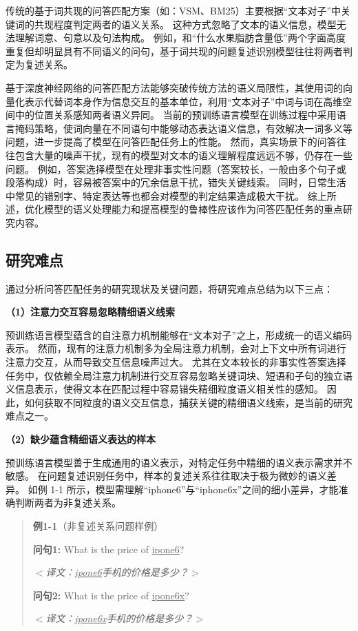 传统的基于词共现的问答匹配方案（如：VSM、BM25）主要根据“文本对子”中关键词的共现程度判定两者的语义关系。
这种方式忽略了文本的语义信息，模型无法理解词意、句意以及句法构成。
例如，{}和{\kai“什么水果脂肪含量低”}两个字面高度重复但却明显具有不同语义的问句，基于词共现的问题复述识别模型往往将两者判定为复述关系。

基于深度神经网络的问答匹配方法能够突破传统方法的语义局限性，其使用词的向量化表示代替词本身作为信息交互的基本单位，利用“文本对子”中词与词在高维空间中的位置关系感知两者语义异同。
当前的预训练语言模型在训练过程中采用语言掩码策略，使词向量在不同语句中能够动态表达语义信息，有效解决一词多义等问题，进一步提高了模型在问答匹配任务上的性能。
然而，真实场景下的问答往往包含大量的噪声干扰，现有的模型对文本的语义理解程度远远不够，仍存在一些问题。
例如，答案选择模型在处理非事实性问题（答案较长，一般由多个句子或段落构成）时，容易被答案中的冗余信息干扰，错失关键线索。
同时，日常生活中常见的错别字、特定表达等也都会对模型的判定结果造成极大干扰。
综上所述，优化模型的语义处理能力和提高模型的鲁棒性应该作为问答匹配任务的重点研究内容。


\subsection{研究难点}

通过分析问答匹配任务的研究现状及关键问题，将研究难点总结为以下三点：

\textbf{\songti （1）注意力交互容易忽略精细语义线索}

预训练语言模型蕴含的自注意力机制能够在“文本对子”之上，形成统一的语义编码表示。
然而，现有的注意力机制多为全局注意力机制，会对上下文中所有词进行注意力交互，从而导致交互信息噪声过大。
尤其在文本较长的非事实性答案选择任务中，仅依赖全局注意力机制进行交互容易忽略关键词块、短语和子句的独立语义信息表示，使得文本在匹配过程中容易错失精细粒度语义相关性的感知。
因此，如何获取不同粒度的语义交互信息，捕获关键的精细语义线索，是当前的研究难点之一。

\textbf{\songti （2）缺少蕴含精细语义表达的样本}

预训练语言模型善于生成通用的语义表示，对特定任务中精细的语义表示需求并不敏感。
在问题复述识别任务中，样本的复述关系往往取决于极为微妙的语义差异。
如例 1-1 所示，模型需理解{\kai“iphone6”}与{\kai“iphone6x”}之间的细小差异，才能准确判断两者为非复述关系。
\begin{quotation}
    \noindent \textbf{\songti 例1-1}（非复述关系问题样例）
    
    \noindent \textbf{问句1:} What is the price of \underline{ipone6}?
    
    \noindent $<$\textit{译文：\underline{ipone6}手机的价格是多少？}$>$
    
    \noindent \textbf{问句2:} What is the price of \underline{ipone6x}?
    
    \noindent $<$\textit{译文：\underline{ipone6x}手机的价格是多少？}$>$
    
\end{quotation}

